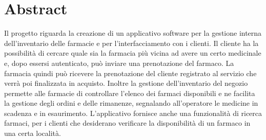 \newpage
{}
\section{Abstract}
Il progetto riguarda la creazione di un applicativo software per la gestione interna dell’inventario delle farmacie e per l'interfacciamento con i clienti. 
Il cliente ha la possibilità di cercare quale sia la farmacia più vicina ad avere un certo medicinale e, dopo essersi autenticato, può inviare una prenotazione del farmaco.
La farmacia quindi può ricevere la prenotazione del cliente registrato al servizio che verrà poi finalizzata in acquisto. 
Inoltre la gestione dell’inventario del negozio permette alle farmacie di controllare l’elenco dei farmaci disponibili e ne facilita la gestione degli ordini e delle rimanenze, segnalando all'operatore le medicine in scadenza e in esaurimento.
L'applicativo fornisce anche una funzionalità di ricerca farmaci, per i clienti che desiderano verificare la disponibilità di un farmaco in una certa località.
